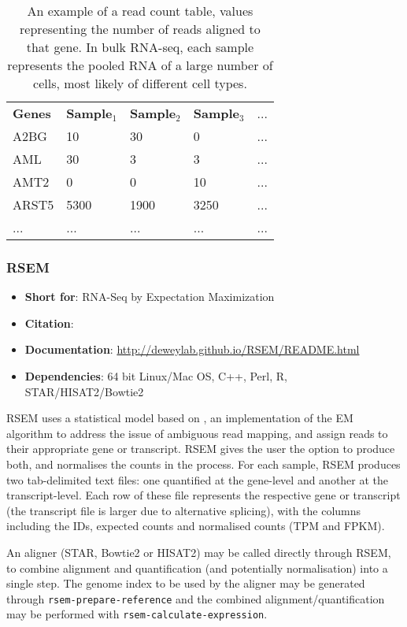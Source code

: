 \begin{table}[h]
\centering
\caption{An example of a read count table, values representing the number of reads aligned to that gene. In bulk RNA-seq, each sample represents the pooled RNA of a large number of cells, most likely of different cell types.}
\label{tab:read_count}
\begin{tabular}{lllll}
\textbf{Genes} & \textbf{Sample$_{1}$} & \textbf{Sample$_{2}$} & \textbf{Sample$_{3}$} & ...  \\
A2BG  & 10      & 30      & 0       & ...  \\
AML   & 30      & 3       & 3       & ...  \\
AMT2  & 0       & 0       & 10      & ...  \\
ARST5 & 5300    & 1900    & 3250    & ...  \\
...   & ...     & ...     & ...     & ... 
\end{tabular}
\end{table}

\subsubsection{RSEM}
\begin{itemize}\itemsep-0.5em
\item[] \textbf{Short for}: RNA-Seq by Expectation Maximization
\item[] \textbf{Citation}: 				\cite{li2011rsem}
\item[] \textbf{Documentation}: 	\url{http://deweylab.github.io/RSEM/README.html}
\item[] \textbf{Dependencies}: 64 bit Linux/Mac OS, C++, Perl, R, STAR/HISAT2/Bowtie2
\end{itemize}

RSEM uses a statistical model based on \cite{li2010rna}, an implementation of the EM algorithm to address the issue of ambiguous read mapping, and assign reads to their appropriate gene or transcript. RSEM gives the user the option to produce both, and normalises the counts in the process. For each sample, RSEM produces two tab-delimited text files: one quantified at the gene-level and another at the transcript-level. Each row of these file represents the respective gene or transcript (the transcript file is larger due to alternative splicing), with the columns including the IDs, expected counts and normalised counts (TPM and FPKM).

An aligner (STAR, Bowtie2 or HISAT2) may be called directly through RSEM, to combine alignment and quantification (and potentially normalisation) into a single step. The genome index to be used by the aligner may be generated through \texttt{rsem-prepare-reference} and the combined alignment/quantification may be performed with \texttt{rsem-calculate-expression}.

